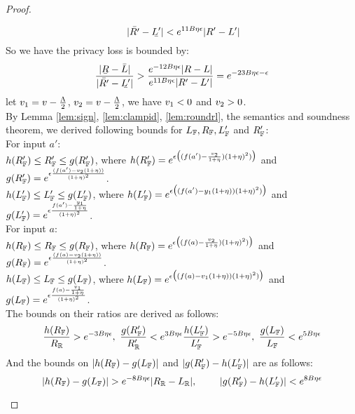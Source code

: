 \documentclass[a4paper,11pt]{article}
\begin{document}
\begin{proof}
\begin{itemize}
\[		~ |\bar{R'} - \ubar{L'}| < e^{11 B\eta \epsilon}|R' - L'|
		\]
		So we have the privacy loss is bounded by:
		\[
		\frac{|\ubar{R} - \bar{L}|}{|\bar{R'} - \ubar{L'}|}
		> \frac{e^{-12 B\eta \epsilon}|R - L|}{e^{11 B\eta \epsilon}|R' - L'|}
		= e^{-23B \eta \epsilon - \epsilon}
		\]
		let $v_1 = v - \frac{\Lambda}{2}$, 
		$v_2 = v - \frac{\Lambda}{2}$, 
		we have $v_1 < 0$ and $v_2 > 0$.
		\\
		By Lemma \ref{lem:sign}, \ref{lem:clampid}, \ref{lem:roundrl}, the semantics and soundness theorem, we derived following bounds for $L_{\mathbb{F}}, R_{\mathbb{F}}, L_{\mathbb{F}}'$ and $R_{\mathbb{F}}'$:
		\\
		For input $a'$:
		\\
		$h(R_{\mathbb{F}}') \leq R_{\mathbb{F}}' \leq g(R_{\mathbb{F}}')$, 
		where
		$h(R_{\mathbb{F}}') = e^{\epsilon 
				\big( (f(a') - \frac{v_2}{1 + \eta}) (1 + \eta)^2) \big)}$
		and 
		$g(R_{\mathbb{F}}') = e^{\epsilon 
				\frac{(f(a') - v_2(1 + \eta))}{(1 + \eta)^2}}$.
		\\
		$h(L_{\mathbb{F}}') \leq L_{\mathbb{F}}' \leq g(L_{\mathbb{F}}')$, 
		where
		$h(L_{\mathbb{F}}') = e^{\epsilon 
				\big( (f(a') - y_1(1 + \eta)) (1 + \eta)^2) \big)}$
		and 
		$g(L_{\mathbb{F}}') = e^{\epsilon 
				\frac{f(a') - \frac{y_1}{1 + \eta}}{(1 + \eta)^2}}$.
		\\
		For input $a$:
		\\
		$h(R_{\mathbb{F}}) \leq R_{\mathbb{F}} \leq g(R_{\mathbb{F}})$, 
		where
		$h(R_{\mathbb{F}}) = e^{\epsilon 
				\big( (f(a) - \frac{v_2}{1 + \eta}) (1 + \eta)^2) \big)}$
		and 
		$g(R_{\mathbb{F}}) = e^{\epsilon 
				\frac{(f(a) - v_2(1 + \eta))}{(1 + \eta)^2}}$.
		\\
		$h(L_{\mathbb{F}}) \leq L_{\mathbb{F}} \leq g(L_{\mathbb{F}})$, 
		where
		$h(L_{\mathbb{F}}) = e^{\epsilon 
				\big( (f(a) - v_1(1 + \eta)) (1 + \eta)^2) \big)}$
		and 
		$g(L_{\mathbb{F}}) = e^{\epsilon 
				\frac{f(a) - \frac{v_1}{1 + \eta}}{(1 + \eta)^2}}$.
		\\
		The bounds on their ratios are derived as follows:
		\[
		\frac{h(R_{\mathbb{F}})}{R_{\mathbb{R}}} > e^{-3B\eta \epsilon}, 
		~ 
		\frac{g(R_{\mathbb{F}}')}{R_{\mathbb{R}}'} < e^{3B\eta \epsilon}
		\frac{h(L_{\mathbb{F}}')}{L_{\mathbb{F}}'} > e^{-5B\eta \epsilon}, 
		~ 
		\frac{g(L_{\mathbb{F}})}{L_{\mathbb{F}}} < e^{5B\eta \epsilon}
		\]
		And the bounds on $|h(R_{\mathbb{F}}) - g(L_{\mathbb{F}})|$
		and $|g(R_{\mathbb{F}}') - h(L_{\mathbb{F}}')|$ are as follows:
		\[
		|h(R_{\mathbb{F}}) - g(L_{\mathbb{F}})| > e^{-8 B\eta \epsilon}
		|R_{\mathbb{R}} - L_{\mathbb{R}}|, 
		~~~~~~~
		|g(R_{\mathbb{F}}') - h(L_{\mathbb{F}}')| < e^{8 B\eta \epsilon}
\]
\end{itemize}
\end{proof}
\end{document}
